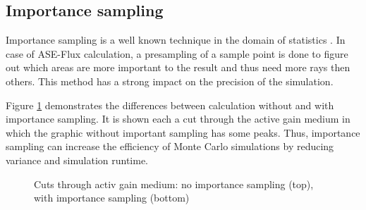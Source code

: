 \subsection{Importance sampling}
Importance sampling is a well known technique in the domain
of statistics \cite{importanceSamplingSource}. In case of 
ASE-Flux calculation, a presampling of a sample point is done
to figure out which areas are more important to the result
and thus need more rays then others. This method has a strong
impact on the precision of the simulation.

Figure \ref{graphic:importance} demonstrates
the differences between calculation without and with
importance sampling. It is shown each a cut through the active
gain medium in which the graphic without important
sampling has some peaks. Thus, importance 
sampling can increase the efficiency of Monte Carlo simulations 
by reducing variance and simulation runtime. 
\begin{figure}
  \centerline
  {}
  \caption{Cuts through activ gain medium: no importance sampling (top), with importance sampling (bottom)}
  \label{graphic:importance}
\end{figure}

